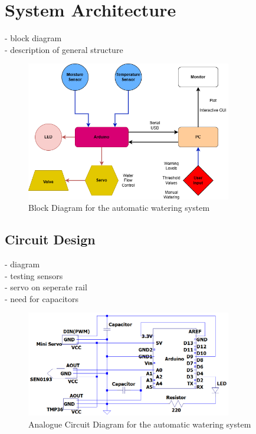 \documentclass[a4paper,11pt]{article}
\begin{document}
\section{System Architecture}
\label{sec:System_Architecture}

- block diagram\\
- description of general structure

\begin{figure}[H]
    \centering
    \includegraphics[width=0.8\textwidth]{Datalogger Block Diagram - final.png}
    \caption{Block Diagram for the automatic watering system}
    \label{fig:Block_Diagram_for_the_automatic_watering_system}
\end{figure}

\subsection{Circuit Design}
\label{Cicuit_Design}

- diagram\\
- testing sensors\\
- servo on seperate rail\\ 
- need for capacitors

\begin{figure}[H]
    \centering
    \includegraphics[width=0.8\textwidth]{Analogue Circuit Diagram - final.png}
    \caption{Analogue Circuit Diagram for the automatic watering system}
    \label{fig:Analogue_Circuit_Diagram_for_the_automatic_watering_system}
\end{figure}
\end{document}
